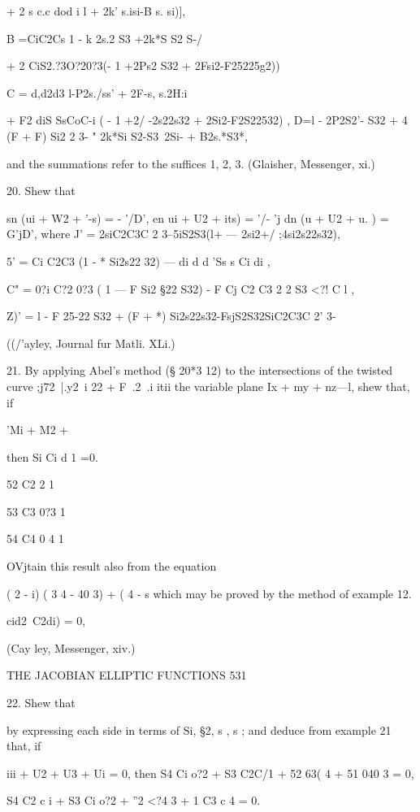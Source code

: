 + 2  s c.c dod i  l + 2k' s.isi-B s. si)], 

B =CiC2Cs  1 - k 2s.2 S3 +2k*S S2 S-/  

+ 2  CiS2.?3O?20?3(- 1 +2Ps2 S32 + 2Fsi2-F25225g2))  

C = d,d2d3 l-P2s./ss'  + 2F-s, s.2H:i   

+ F2  diS SsCoC-i ( - 1 +2/ -2s22s32 + 2Si2-F2S22532) , 
D=l - 2P2S2'- S32 + 4 (F + F) Si2 2  3- " 2k*Si S2-S3~2Si- + B2s.*S3*, 

and the summations refer to the suffices 1, 2, 3. (Glaisher, Messenger, xi.) 

20. Shew that 

sn (ui + W2 +  '-s) = - '/D', en  ui + U2 + its) =  '/- 'j dn (u  + U2 + u. ) = G'jD', 
where J' = 2siC2C3C 2 3--5iS2S3(l+  —  2si2+/ ;4si2s22s32), 

5' = Ci C2C3 (1 -  * Si2s22 32) — di d d 'Ss s Ci di , 

C" = 0?i C?2 0?3 ( 1 — F Si2 §22 S32) - F Cj C2 C3 2 2 S3 <?! C l , 

Z)' = l - F 25-22 S32 + (F +  *) Si2s22s32-FsjS2S32SiC2C3C 2' 3- 

((/'ayley, Journal fur Matli. XLi.) 

21. By applying Abel's method (§ 20*3 12) to the intersections of the twisted curve 
;j72\ |.y2\ i  22 + F\  .2\ .i  itii the variable plane Ix + my + nz—l, shew that, if 

'Mi + M2 + %

then Si Ci d  1 =0. 

52 C2  2 1 

53 C3 0?3 1 

54 C4 0 4 1 

OVjtain this result also from the equation 

( 2 -  i) ( 3 4 -  40 3) + ( 4 - s 
which may be proved by the method of example 12. 



 cid2~C2di) = 0, 

(Cay ley, Messenger, xiv.) 



THE JACOBIAN ELLIPTIC FUNCTIONS 531 

22. Shew that 

by expressing each side in terms of Si, §2, s , s  ; and deduce from example 21 that, if 

iii + U2 + U3 + Ui = 0, 
then S4 Ci o?2 + S3 C2C/1 + 52 63( 4 + 51 040 3 = 0, 

S4 C2 c i + S3 Ci o?2 +  ''2 <?4  3 +  1 C3 c 4 = 0. 


